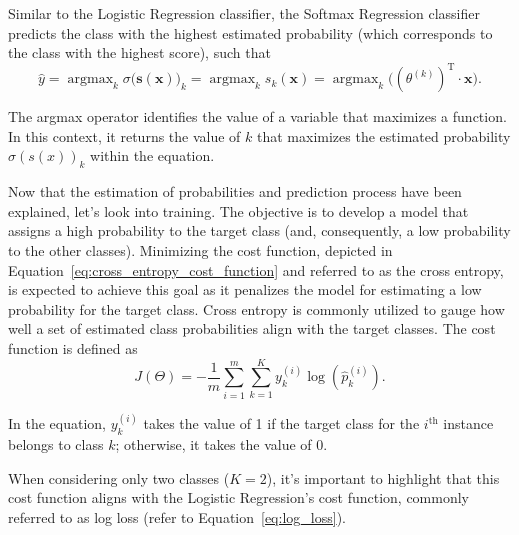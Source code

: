 \documentclass[12pt,letter]{article}
\begin{document}
Similar to the Logistic Regression classifier, the Softmax Regression classifier predicts the class with the highest estimated probability (which corresponds to the class with the highest score), such that
\begin{equation}
\hat{y} = \mathop{\text{argmax}}_{k} \sigma \big(\textbf{s}(\textbf{x})\big)_k = \mathop{\text{argmax}}_{k} s_k(\textbf{x}) = \mathop{\text{argmax}}_{k} \big( (\theta^{(k)})^\text{T} \cdot \textbf{x} \big).
\end{equation}

\begin{mdframed}[middlelinewidth=0.5mm]
\begin{center}
\end{center}
The argmax operator identifies the value of a variable that maximizes a function. In this context, it returns the value of $k$ that maximizes the estimated probability $\sigma(s(x))_k$ within the equation.

\end{mdframed}
Now that the estimation of probabilities and prediction process have been explained, let's look into training. The objective is to develop a model that assigns a high probability to the target class (and, consequently, a low probability to the other classes). Minimizing the cost function, depicted in Equation~\ref{eq:cross_entropy_cost_function} and referred to as the cross entropy, is expected to achieve this goal as it penalizes the model for estimating a low probability for the target class. Cross entropy is commonly utilized to gauge how well a set of estimated class probabilities align with the target classes. The cost function is defined as
\begin{equation}
J(\Theta) = -\frac{1}{m} \sum_{i=1}^{m} \sum_{k=1}^{K} y_k^{(i)} \log (\hat{p}_k^{(i)}).
\label{eq:cross_entropy_cost_function}
\end{equation}

\begin{mdframed}[middlelinewidth=0.5mm]
\begin{center}
\end{center}
In the equation, $y_k^{(i)}$ takes the value of 1 if the target class for the $i^\text{th}$ instance belongs to class $k$; otherwise, it takes the value of 0.

\end{mdframed}
When considering only two classes ($K = 2$), it's important to highlight that this cost function aligns with the Logistic Regression's cost function, commonly referred to as log loss (refer to Equation~\ref{eq:log_loss}).
\end{document}
